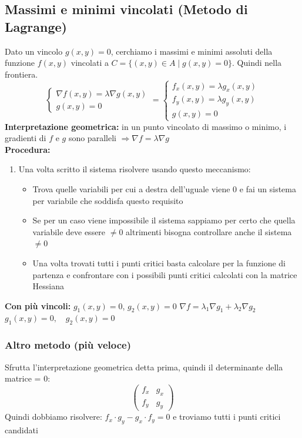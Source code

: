 \documentclass[10pt, a4paper]{article}
\begin{document}
    \subsection{Massimi e minimi vincolati (Metodo di Lagrange)}
        Dato un vincolo $g(x, y) = 0 $, cerchiamo i massimi e minimi assoluti della funzione $f(x, y)$ vincolati a $C = \{(x, y) \in A \mid g(x, y) = 0\}$. Quindi nella frontiera.
        \begin{equation*}
            \begin{cases}
                \nabla f(x, y) = \lambda \nabla g(x, y) \\
                g(x, y) = 0
            \end{cases} = \begin{cases}
                f_x(x,y) = \lambda g_x(x,y)\\
                f_y(x,y) = \lambda g_y(x,y)\\
                g(x,y) = 0
            \end{cases}
        \end{equation*}
        \textbf{Interpretazione geometrica:} in un punto vincolato di massimo o minimo, i gradienti di $f$ e $g$ sono paralleli $\Rightarrow \nabla f = \lambda \nabla g$
        \\\textbf{Procedura:}
        \begin{enumerate}
            \item Una volta scritto il sistema risolvere usando questo meccanismo: \begin{itemize}
                \item Trova quelle variabili per cui a destra dell'uguale viene 0 e fai un sistema per variabile che soddisfa questo requisito
                \item Se per un caso viene impossibile il sistema sappiamo per certo che quella variabile deve essere $\neq 0$ altrimenti bisogna controllare anche il sistema $\neq 0$
                \item Una volta trovati tutti i punti critici basta calcolare per la funzione di partenza e confrontare con i possibili punti critici calcolati con la matrice Hessiana
            \end{itemize}
        \end{enumerate}
    \textbf{Con più vincoli: } $g_1(x, y) = 0$, $g_2(x, y) = 0$
    $\nabla f = \lambda_1 \nabla g_1 + \lambda_2 \nabla g_2$
    $g_1(x, y) = 0, \quad g_2(x, y) = 0$
    \subsubsection{Altro metodo (più veloce)}
        Sfrutta l'interpretazione geometrica detta prima, quindi il determinante della matrice = 0:
        $$
        \begin{pmatrix}
            f_x & g_x\\
            f_y & g_y
        \end{pmatrix}
        $$
        Quindi dobbiamo risolvere: $\displaystyle f_x\cdot g_y- g_x\cdot f_y=0$ e troviamo tutti i punti critici candidati
\end{document}
